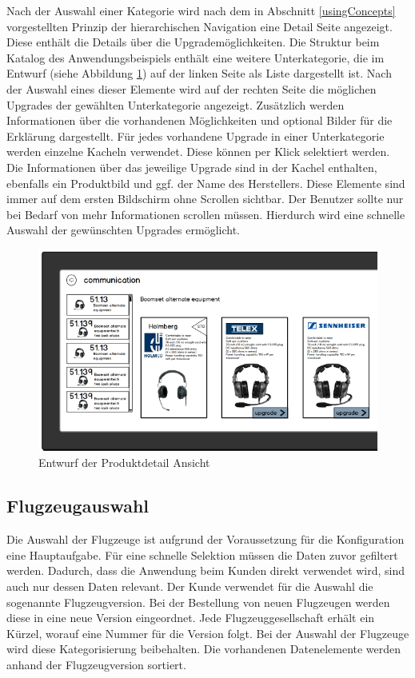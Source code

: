 Nach der Auswahl einer Kategorie wird nach dem in Abschnitt \ref{usingConcepts} vorgestellten Prinzip der hierarchischen Navigation eine Detail Seite angezeigt. Diese enthält die Details über die Upgrademöglichkeiten. Die Struktur beim Katalog des Anwendungsbeispiels enthält eine weitere Unterkategorie, die im Entwurf (siehe Abbildung \ref{detailSketch}) auf der linken Seite als Liste dargestellt ist. Nach der Auswahl eines dieser Elemente wird auf der rechten Seite die möglichen Upgrades der gewählten Unterkategorie angezeigt. Zusätzlich werden Informationen über die vorhandenen Möglichkeiten und optional Bilder für die Erklärung dargestellt.  Für jedes vorhandene Upgrade in einer Unterkategorie werden einzelne Kacheln verwendet. Diese können per Klick selektiert werden. Die Informationen über das jeweilige Upgrade sind in der Kachel enthalten, ebenfalls ein Produktbild und ggf. der Name des Herstellers. Diese Elemente sind immer auf dem ersten Bildschirm ohne Scrollen sichtbar. Der Benutzer sollte nur bei Bedarf von mehr Informationen scrollen müssen. Hierdurch wird eine schnelle Auswahl der gewünschten Upgrades ermöglicht. 
\begin{figure}[H]
\centering
\includegraphics[width=\hsize]{images/detail_entwurf}
\caption{Entwurf der Produktdetail Ansicht}
\label{detailSketch}
\end{figure}

\subsection{Flugzeugauswahl}
Die Auswahl der Flugzeuge ist aufgrund der Voraussetzung für die Konfiguration eine Hauptaufgabe. Für eine schnelle Selektion müssen die Daten zuvor gefiltert werden. Dadurch, dass die Anwendung beim Kunden direkt verwendet wird, sind auch nur dessen Daten relevant. Der Kunde verwendet für die Auswahl die sogenannte Flugzeugversion. Bei der Bestellung von neuen Flugzeugen werden diese in eine neue Version eingeordnet. Jede Flugzeuggesellschaft erhält ein Kürzel, worauf eine Nummer für die Version folgt. Bei der Auswahl der Flugzeuge wird diese Kategorisierung beibehalten. Die vorhandenen Datenelemente werden anhand der Flugzeugversion sortiert. \par

